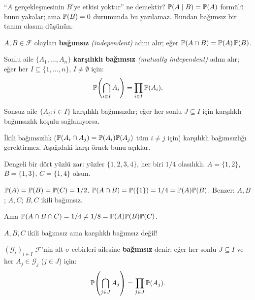 \begin{kesif}
``$A$ gerçekleşmesinin $B$'ye etkisi yoktur'' ne demektir?
$\mathbb{P}(A \mid B) = \mathbb{P}(A)$ formülü bunu yakalar; ama $\mathbb{P}(B)=0$ durumunda
bu yazılamaz. Bundan bağımsız bir tanım olasını düşünün.
\end{kesif}

\begin{tanim}\label{def:bagimsiz_olay}
$A, B \in \mathcal{F}$ olayları \textbf{bağımsız} \emph{(independent)} adını alır;
eğer $\mathbb{P}(A \cap B) = \mathbb{P}(A)\,\mathbb{P}(B)$.

Sonlu aile $\{A_1,\ldots,A_n\}$ \textbf{karşılıklı bağımsız}
\emph{(mutually independent)} adını alır; eğer her $I \subseteq \{1,\ldots,n\}$,
$I \neq \emptyset$ için:
\[
  \mathbb{P}\!\left(\bigcap_{i \in I} A_i\right) = \prod_{i \in I} \mathbb{P}(A_i).
\]

Sonsuz aile $\{A_i : i \in I\}$ karşılıklı bağımsızdır; eğer her sonlu
$J \subseteq I$ için karşılıklı bağımsızlık koşulu sağlanıyorsa.
\end{tanim}

\begin{kritiksorgu}
İkili bağımsızlık ($\mathbb{P}(A_i \cap A_j) = \mathbb{P}(A_i)\mathbb{P}(A_j)$ tüm $i \neq j$
için) karşılıklı bağımsızlığı gerektirmez. Aşağıdaki karşı örnek bunu açıklar.
\end{kritiksorgu}

\begin{karsiornek}\label{ex:bernstein}
Dengeli bir dört yüzlü zar: yüzler $\{1,2,3,4\}$, her biri $1/4$ olasılıklı.
$A = \{1,2\}$, $B = \{1,3\}$, $C = \{1,4\}$ olsun.

$\mathbb{P}(A)=\mathbb{P}(B)=\mathbb{P}(C)=1/2$.
$\mathbb{P}(A \cap B) = \mathbb{P}(\{1\}) = 1/4 = \mathbb{P}(A)\mathbb{P}(B)$. Benzer: $A,B$; $A,C$; $B,C$ ikili bağımsız.

Ama $\mathbb{P}(A \cap B \cap C) = 1/4 \neq 1/8 = \mathbb{P}(A)\mathbb{P}(B)\mathbb{P}(C)$.

$A, B, C$ ikili bağımsız ama karşılıklı bağımsız değil!
\end{karsiornek}

\begin{tanim}\label{def:sigmababag}
$(\mathcal{G}_i)_{i \in I}$ $\mathcal{F}$'nin alt $\sigma$-cebirleri ailesine
\textbf{bağımsız} denir; eğer her sonlu $J \subseteq I$ ve her
$A_j \in \mathcal{G}_j$ ($j \in J$) için:
\[
  \mathbb{P}\!\left(\bigcap_{j \in J} A_j\right) = \prod_{j \in J} \mathbb{P}(A_j).
\]
\end{tanim}

